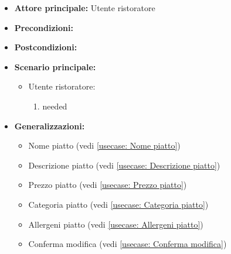 \label{usecase:Modifica piatto}
\begin{itemize}
\item \textbf{Attore principale:}  Utente ristoratore
\item \textbf{Precondizioni:}
\item \textbf{Postcondizioni:}
\item \textbf{Scenario principale:}
\begin{itemize}
\item  Utente ristoratore:
\begin{enumerate}
\item needed
\end{enumerate}
\end{itemize}
\item \textbf{Generalizzazioni:}
\begin{itemize}
\item  Nome piatto (vedi \autoref{usecase: Nome piatto})
\item  Descrizione piatto (vedi \autoref{usecase: Descrizione piatto})
\item  Prezzo piatto (vedi \autoref{usecase: Prezzo piatto})
\item  Categoria piatto (vedi \autoref{usecase: Categoria piatto})
\item  Allergeni piatto (vedi \autoref{usecase: Allergeni piatto})
\item  Conferma modifica (vedi \autoref{usecase: Conferma modifica})
\end{itemize}
\end{itemize}